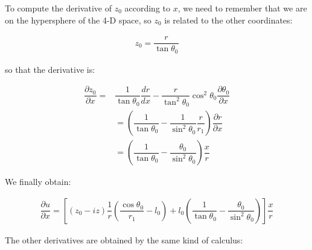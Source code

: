 \documentclass[12pt]{article}
\begin{document}
To compute the derivative of $z_0$ according to $x$, we need to remember that we are on the hypersphere of the 4-D space, so $z_0$ is related to the other coordinates:

\begin{eqnarray}
z_0=\dfrac{r}{\tan \theta_0}
\end{eqnarray}

so that the derivative is:

\begin{eqnarray}
\dfrac{\partial z_0}{\partial x}=&\dfrac{1}{\tan \theta_0}\dfrac{dr}{dx}-\dfrac{r}{\tan^2 \theta_0} \cos^2 \theta_0 \dfrac{\partial \theta_0}{\partial x} \nonumber \\
&=\left(\dfrac{1}{\tan \theta_0}-\dfrac{1}{\sin^2\theta_0} \dfrac{r}{r_1}\right)\dfrac{\partial r}{\partial x} \\ 
&=\left(\dfrac{1}{\tan \theta_0}-\dfrac{\theta_0}{\sin^2\theta_0}\right)\dfrac{x}{r} \nonumber 
\end{eqnarray}

We finally obtain:

\begin{eqnarray} \label{eqn:dux}
\dfrac{\partial u}{\partial x}=\left[\left(z_0-iz\right)\dfrac{1}{r}\left(\dfrac{\cos \theta_0}{r_1}-l_0\right)+l_0 \left(\dfrac{1}{\tan \theta_0}-\dfrac{\theta_0}{\sin^2\theta_0}\right)\right]\dfrac{x}{r}
\end{eqnarray}

The other derivatives are obtained by the same kind of calculus:
\end{document}
